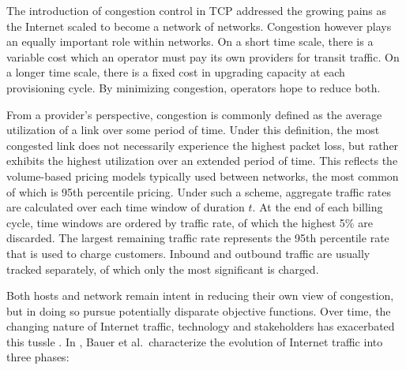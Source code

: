 The introduction of congestion control in \ac{TCP} addressed the growing pains as the Internet scaled to become a network of networks.
Congestion however plays an equally important role within networks.
On a short time scale, there is a variable cost which an operator must pay its own providers for transit traffic. 
On a longer time scale, there is a fixed cost in upgrading capacity at each provisioning cycle.
By minimizing congestion, operators hope to reduce both. 

From a provider's perspective, congestion is commonly defined as the average utilization of a link over some period of time. 
Under this definition, the most congested link does not necessarily experience the highest packet loss, but rather exhibits the highest utilization over an extended period of time.
This reflects the volume-based pricing models typically used between networks, the most common of which is 95th percentile pricing.
Under such a scheme, aggregate traffic rates are calculated over each time window of duration $t$.
At the end of each billing cycle, time windows are ordered by traffic rate, of which the highest 5\% are discarded.
The largest remaining traffic rate represents the 95th percentile rate that is used to charge customers.
Inbound and outbound traffic are usually tracked separately, of which only the most significant is charged.

Both hosts and network remain intent in reducing their own view of congestion, but in doing so pursue potentially disparate objective functions.
Over time, the changing nature of Internet traffic, technology and stakeholders has exacerbated this tussle \cite{Clark:2005p67}.
In \cite{Bauer:2009p200}, Bauer et al.\ characterize the evolution of Internet traffic into three phases:


